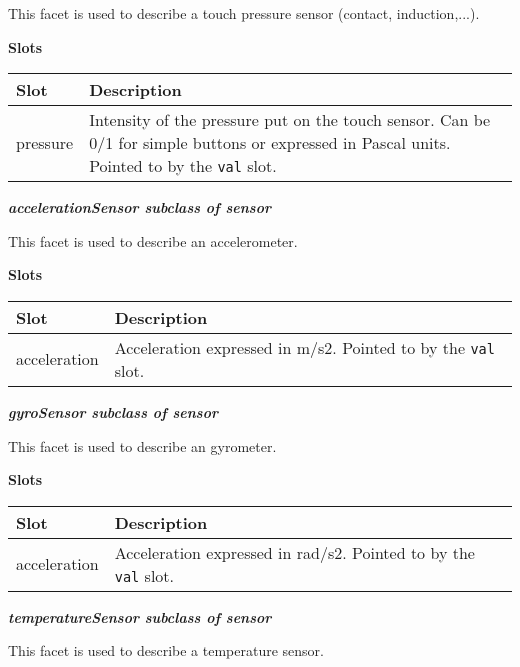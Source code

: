 \documentclass[a4paper]{article}
\begin{document}
{\sffamily
This facet is used to describe a touch pressure sensor (contact,
induction,...).}

{\sffamily\bfseries
Slots}

\begin{flushleft}
\tablehead{}
\begin{supertabular}{|m{2.8669999cm}|m{12.422cm}|}
\hline
\sffamily\bfseries Slot &
\sffamily\bfseries Description\\\hline
pressure &
\sffamily Intensity of the pressure put on the
touch sensor. Can be 0/1 for simple buttons or expressed in Pascal
units. Pointed to by the \texttt{val} slot.\\\hline
\end{supertabular}
\end{flushleft}
{\sffamily\bfseries\itshape
 accelerationSensor  \textmd{subclass of sensor}}

{\sffamily
This facet is used to describe an accelerometer.}

{\sffamily\bfseries
Slots}

\begin{flushleft}
\tablehead{}
\begin{supertabular}{|m{3.651cm}|m{11.639cm}|}
\hline
\sffamily\bfseries Slot &
\sffamily\bfseries Description\\\hline
acceleration &
\sffamily Acceleration expressed in m/s2.
Pointed to by the \texttt{val} slot.\\\hline
\end{supertabular}
\end{flushleft}
{\sffamily\bfseries\itshape
gyroSensor  \textmd{subclass of sensor}}

{\sffamily
This facet is used to describe an gyrometer.}

{\sffamily\bfseries
Slots}

\begin{flushleft}
\tablehead{}
\begin{supertabular}{|m{3.651cm}|m{11.639cm}|}
\hline
\sffamily\bfseries Slot &
\sffamily\bfseries Description\\\hline
acceleration &
\sffamily Acceleration expressed in rad/s2.
Pointed to by the \texttt{val} slot.\\\hline
\end{supertabular}
\end{flushleft}
{\sffamily\bfseries\itshape
 temperatureSensor  \textmd{subclass of sensor}}

{\sffamily
This facet is used to describe a temperature sensor.}
\end{document}
